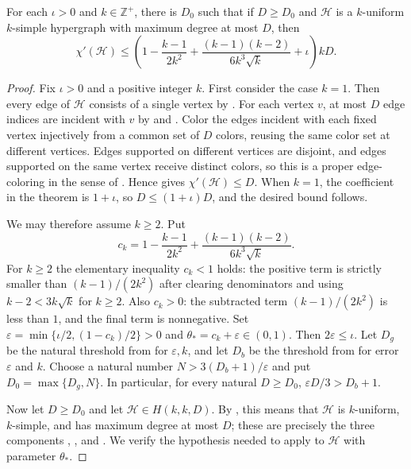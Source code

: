 \begin{theorem}
For each $\iota>0$ and $k\in\mathbb Z^+$, there is $D_0$ such that if
$D\ge D_0$ and $\mathcal H$ is a $k$-uniform $k$-simple hypergraph with
maximum degree at most $D$, then
\[
\chi'(\mathcal H)\le
\left(1-\frac{k-1}{2k^2}
+\frac{(k-1)(k-2)}{6k^3\sqrt{k}}+\iota\right)kD.
\]
\end{theorem}
\begin{proof}
Fix $\iota>0$ and a positive integer $k$.  First consider the case
$k=1$.  Then every edge of $\mathcal H$ consists of a single vertex by
.  For each vertex $v$, at most $D$ edge indices
are incident with $v$ by  and
.  Color the edges incident with each fixed
vertex injectively from a common set of $D$ colors, reusing the same color
set at different vertices.  Edges supported on different vertices are
disjoint, and edges supported on the same vertex receive distinct colors, so
this is a proper edge-coloring in the sense of
.  Hence
 gives $\chi'(\mathcal H)\le D$.  When
$k=1$, the coefficient in the theorem is $1+\iota$, so
$D\le(1+\iota)D$, and the desired bound follows.

We may therefore assume $k\ge2$.  Put
\[
c_k=
1-\frac{k-1}{2k^2}
+\frac{(k-1)(k-2)}{6k^3\sqrt{k}}.
\]
For $k\ge2$ the elementary inequality $c_k<1$ holds: the positive term is
strictly smaller than $(k-1)/(2k^2)$ after clearing denominators and using
$k-2<3k\sqrt{k}$ for $k\ge2$. Also $c_k>0$: the subtracted term
$(k-1)/(2k^2)$ is less than $1$, and the final term is nonnegative.
Set $\varepsilon=\min\{\iota/2,(1-c_k)/2\}>0$ and
$\theta_*=c_k+\varepsilon\in(0,1)$. Then $2\varepsilon\le\iota$.
Let $D_g$ be the natural threshold from 
for $\varepsilon,k$, and let $D_b$ be the threshold from
 for error $\varepsilon$ and $k$.
Choose a natural number $N>3(D_b+1)/\varepsilon$ and put
$D_0=\max\{D_g,N\}$. In particular, for every natural $D\ge D_0$,
$\varepsilon D/3>D_b+1$.

Now let $D\ge D_0$ and let $\mathcal H\in H(k,k,D)$.  By
, this means that $\mathcal H$ is $k$-uniform,
$k$-simple, and has maximum degree at most $D$; these are precisely the
three components , ,
and .  We verify the hypothesis needed to apply
 to $\mathcal H$ with parameter
$\theta_*$.


\end{proof}

